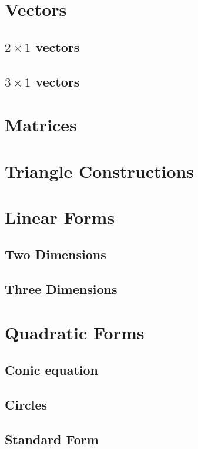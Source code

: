\documentclass[11pt]{book}
\begin{document}
% 
\backmatter
\iffalse
\appendix
\chapter{ Vectors}
\section{$2\times 1$ vectors}

%
\section{$3\times 1$ vectors}

\chapter{Matrices}



\chapter{Triangle Constructions}



\chapter{Linear Forms}
\section{Two Dimensions}

\section{Three Dimensions}

\chapter{Quadratic Forms}
\section{Conic equation }

\section{Circles}


\section{Standard Form}

\end{document}
